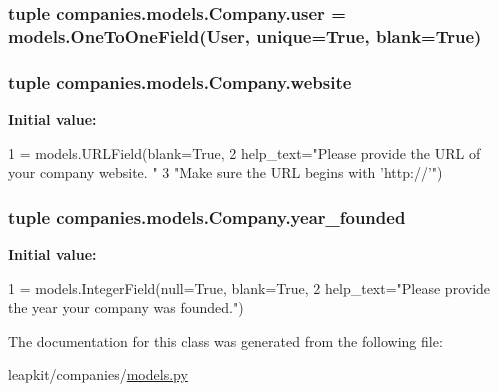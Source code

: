 \hypertarget{classcompanies_1_1models_1_1_company_ae07154b2ed7072e23019e4bacd78a9ab}{
\subsubsection[{user}]{\setlength{\rightskip}{0pt plus 5cm}tuple companies.\-models.\-Company.\-user = models.\-One\-To\-One\-Field(User, {\bf unique}=True, blank=True)\hspace{0.3cm}{\ttfamily [static]}}}\label{classcompanies_1_1models_1_1_company_ae07154b2ed7072e23019e4bacd78a9ab}
\hypertarget{classcompanies_1_1models_1_1_company_a52436e833c6ca3ddab6193fbbc1b500a}{
\subsubsection[{website}]{\setlength{\rightskip}{0pt plus 5cm}tuple companies.\-models.\-Company.\-website\hspace{0.3cm}{\ttfamily [static]}}}\label{classcompanies_1_1models_1_1_company_a52436e833c6ca3ddab6193fbbc1b500a}
{\bfseries Initial value\-:}
\begin{DoxyCode}
1 = models.URLField(blank=\textcolor{keyword}{True},
2                               help\_text=\textcolor{stringliteral}{"Please provide the URL of your company website. "}
3                                         \textcolor{stringliteral}{"Make sure the URL begins with 'http://'"})
\end{DoxyCode}
\hypertarget{classcompanies_1_1models_1_1_company_a92439ab9bbcad33155402816996c88d9}{
\subsubsection[{year\-\_\-founded}]{\setlength{\rightskip}{0pt plus 5cm}tuple companies.\-models.\-Company.\-year\-\_\-founded\hspace{0.3cm}{\ttfamily [static]}}}\label{classcompanies_1_1models_1_1_company_a92439ab9bbcad33155402816996c88d9}
{\bfseries Initial value\-:}
\begin{DoxyCode}
1 = models.IntegerField(null=\textcolor{keyword}{True}, blank=\textcolor{keyword}{True},
2                                        help\_text=\textcolor{stringliteral}{"Please provide the year your company was founded."})
\end{DoxyCode}


The documentation for this class was generated from the following file\-:\begin{DoxyCompactItemize}
\item 
leapkit/companies/\hyperlink{companies_2models_8py}{models.\-py}\end{DoxyCompactItemize}
